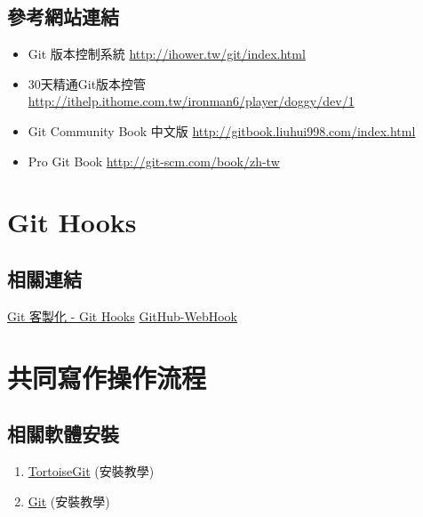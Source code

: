 \documentclass[letterpaper,10pt,english]{sphinxmanual}
\begin{document}
\section{參考網站連結}
\label{_doc/git/index:id2}\begin{itemize}
\item {} 
Git 版本控制系統 \href{http://ihower.tw/git/index.html}{http://ihower.tw/git/index.html}

\item {} 
30天精通Git版本控管 \href{http://ithelp.ithome.com.tw/ironman6/player/doggy/dev/1}{http://ithelp.ithome.com.tw/ironman6/player/doggy/dev/1}

\item {} 
Git Community Book 中文版 \href{http://gitbook.liuhui998.com/index.html}{http://gitbook.liuhui998.com/index.html}

\item {} 
Pro Git Book \href{http://git-scm.com/book/zh-tw}{http://git-scm.com/book/zh-tw}

\end{itemize}


\chapter{Git Hooks}
\label{_doc/git/git_hooks::doc}\label{_doc/git/git_hooks:git-hooks}

\section{相關連結}
\label{_doc/git/git_hooks:id1}
\href{http://git-scm.com/book/zh-tw/Git-客製化-Git-Hooks}{Git 客製化 - Git Hooks}
\href{https://github.com/xPaw/GitHub-WebHook}{GitHub-WebHook}


\chapter{共同寫作操作流程}
\label{_doc/writing/index::doc}\label{_doc/writing/index:id1}

\section{相關軟體安裝}
\label{_doc/writing/index:id2}\begin{enumerate}
\item {} 
\href{https://code.google.com/p/tortoisegit/}{TortoiseGit} (安裝教學)

\item {} 
\href{http://www.git-scm.com/download/win}{Git} (安裝教學)

\end{enumerate}
\end{document}
